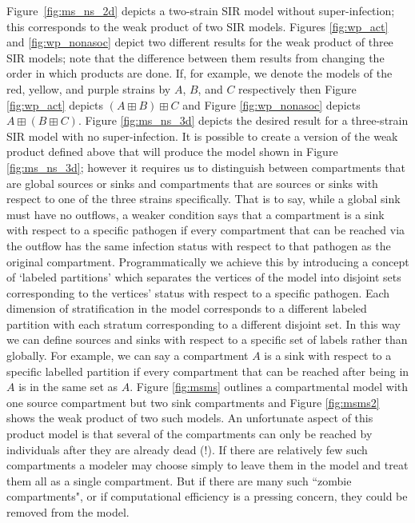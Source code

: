\documentclass{article}
\theoremstyle{definition}
\begin{document}
Figure~\ref{fig:ms_ns_2d} depicts a two-strain SIR model without super-infection; this corresponds to the weak product of two SIR models. Figures \ref{fig:wp_act} and \ref{fig:wp_nonasoc} depict two different results for the weak product of three SIR models; note that the difference between them results from changing the order in which products are done. If, for example, we denote the models of the red, yellow, and purple strains by $A$, $B$, and $C$ respectively then Figure \ref{fig:wp_act} depicts $(A\boxplus B)\boxplus C$ and Figure \ref{fig:wp_nonasoc} depicts $A\boxplus (B\boxplus C)$. Figure \ref{fig:ms_ns_3d} depicts the desired result for a three-strain SIR model with no super-infection. It is possible to create a version of the weak product defined above that will produce the model shown in Figure \ref{fig:ms_ns_3d}; however it requires us to distinguish between compartments that are global sources or sinks and compartments that are sources or sinks with respect to one of the three strains specifically. That is to say, while a global sink must have no outflows, a weaker condition says that a compartment is a sink with respect to a specific pathogen if every compartment that can be reached via the outflow has the same infection status with respect to that pathogen as the original compartment. Programmatically we achieve this by introducing a concept of `labeled partitions' which separates the vertices of the model into disjoint sets corresponding to the vertices' status with respect to a specific pathogen. Each dimension of stratification in the model corresponds to a different labeled partition with each stratum corresponding to a different disjoint set. In this way we can define sources and sinks with respect to a specific set of labels rather than globally. For example, we can say a compartment $A$ is a sink with respect to a specific labelled partition if every compartment that can be reached after being in $A$ is in the same set as $A$. Figure \ref{fig:msms} outlines a compartmental model with one source compartment but two sink compartments and Figure \ref{fig:msms2} shows the weak product of two such models.
An unfortunate aspect of this product model is that several of the compartments can only be reached by individuals after they are already dead (!).
If there are relatively few such compartments a modeler may choose simply to leave them in the model and treat them all as a single compartment. But if there are many such “zombie compartments", or if computational efficiency is a pressing concern, they could be removed  from the model.
\end{document}
